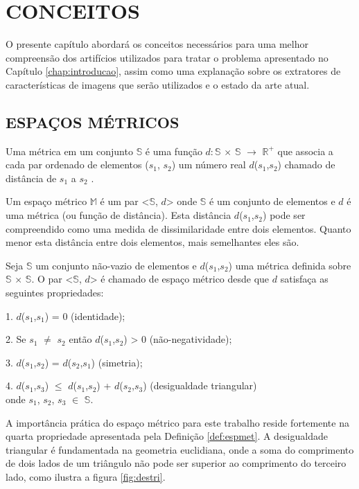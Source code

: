 \chapter{CONCEITOS}
\label{chap:conceitos}
O presente capítulo abordará os conceitos necessários para uma melhor compreensão dos artifícios utilizados para tratar o problema apresentado no Capítulo \ref{chap:introducao}, assim como uma
explanação sobre os extratores de características de imagens que serão utilizados e o estado da arte atual.

\section{ESPAÇOS MÉTRICOS} %
\label{sec:espmet}
Uma métrica em um conjunto $\mathbb{S}$ é uma função $d:\mathbb{S}$ $\times$ $\mathbb{S}$ $\rightarrow$ $\mathbb{R^{+}}$ que associa a cada par 
ordenado de elementos ($s_1$, $s_2$) um número real $d$($s_1$,$s_2$) chamado de distância de $s_1$ a $s_2$ \cite{Lima1977}.\par
Um espaço métrico $\mathbb{M}$ é um par <$\mathbb{S}$, $d$> onde $\mathbb{S}$ é um conjunto de elementos e $d$ é uma métrica
(ou função de distância). Esta distância $d$($s_1$,$s_2$) pode ser compreendido como uma medida de dissimilaridade entre dois elementos.
Quanto menor esta distância entre dois elementos, mais semelhantes eles são.
\begin{mydef}
 \label{def:espmet}
  Seja $\mathbb{S}$ um conjunto não-vazio de elementos e $d$($s_1$,$s_2$) uma métrica definida sobre $\mathbb{S}$ $\times$ $\mathbb{S}$.
   O par <$\mathbb{S}$, $d$> é chamado de espaço métrico desde que $d$ satisfaça as seguintes propriedades:\par
1. $d$($s_1$,$s_1$) = 0 (identidade);\par
2. Se $s_1$ $\neq$ $s_2$ ent\~ao $d$($s_1$,$s_2$) > 0 (n\~ao-negatividade);\par
3. $d$($s_1$,$s_2$) = $d$($s_2$,$s_1$) (simetria);\par
4. $d$($s_1$,$s_3$) $\leq$ $d$($s_1$,$s_2$) + $d$($s_2$,$s_3$) (desigualdade triangular)\\
onde $s_1$, $s_2$, $s_3$ $\in$ $\mathbb{S}$.
\end{mydef}
A importância prática do espaço métrico para este trabalho reside fortemente na quarta propriedade apresentada pela Definição \ref{def:espmet}. A desigualdade triangular é fundamentada na geometria euclidiana, 
onde a soma do comprimento de dois lados de um triângulo não pode ser superior ao comprimento do terceiro lado, como ilustra a figura \ref{fig:destri}.


